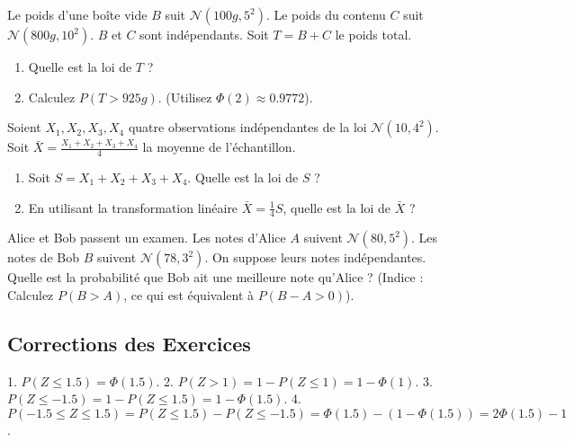 \begin{exercicebox}
Le poids d'une boîte vide $B$ suit $\mathcal{N}(100g, 5^2)$. Le poids du contenu $C$ suit $\mathcal{N}(800g, 10^2)$. $B$ et $C$ sont indépendants.
Soit $T = B+C$ le poids total.
\begin{enumerate}
    \item Quelle est la loi de $T$ ?
    \item Calculez $P(T > 925g)$. (Utilisez $\Phi(2) \approx 0.9772$).
\end{enumerate}
\end{exercicebox}

\begin{exercicebox}
Soient $X_1, X_2, X_3, X_4$ quatre observations indépendantes de la loi $\mathcal{N}(10, 4^2)$.
Soit $\bar{X} = \frac{X_1 + X_2 + X_3 + X_4}{4}$ la moyenne de l'échantillon.
\begin{enumerate}
    \item Soit $S = X_1+X_2+X_3+X_4$. Quelle est la loi de $S$ ?
    \item En utilisant la transformation linéaire $\bar{X} = \frac{1}{4}S$, quelle est la loi de $\bar{X}$ ?
\end{enumerate}
\end{exercicebox}

\begin{exercicebox}
Alice et Bob passent un examen. Les notes d'Alice $A$ suivent $\mathcal{N}(80, 5^2)$. Les notes de Bob $B$ suivent $\mathcal{N}(78, 3^2)$. On suppose leurs notes indépendantes.
Quelle est la probabilité que Bob ait une meilleure note qu'Alice ?
(Indice : Calculez $P(B > A)$, ce qui est équivalent à $P(B - A > 0)$).
\end{exercicebox}

\subsection{Corrections des Exercices}


\begin{correctionbox}
1.  $P(Z \le 1.5) = \Phi(1.5)$.
2.  $P(Z > 1) = 1 - P(Z \le 1) = 1 - \Phi(1)$.
3.  $P(Z \le -1.5) = 1 - P(Z \le 1.5) = 1 - \Phi(1.5)$.
4.  $P(-1.5 \le Z \le 1.5) = P(Z \le 1.5) - P(Z \le -1.5) = \Phi(1.5) - (1 - \Phi(1.5)) = 2\Phi(1.5) - 1$.
\end{correctionbox}

